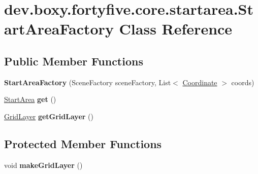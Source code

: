 \hypertarget{classdev_1_1boxy_1_1fortyfive_1_1core_1_1startarea_1_1_start_area_factory}{
\section{dev.boxy.fortyfive.core.startarea.StartAreaFactory Class Reference}
\label{d4/d95/classdev_1_1boxy_1_1fortyfive_1_1core_1_1startarea_1_1_start_area_factory}
}
\subsection*{Public Member Functions}
\begin{DoxyCompactItemize}
\item 
\hypertarget{classdev_1_1boxy_1_1fortyfive_1_1core_1_1startarea_1_1_start_area_factory_a0b81529c72cd5f4fe4e46e2f969b6a90}{
{\bfseries StartAreaFactory} (SceneFactory sceneFactory, List$<$ \hyperlink{classdev_1_1boxy_1_1fortyfive_1_1core_1_1startarea_1_1_coordinate}{Coordinate} $>$ coords)}
\label{d4/d95/classdev_1_1boxy_1_1fortyfive_1_1core_1_1startarea_1_1_start_area_factory_a0b81529c72cd5f4fe4e46e2f969b6a90}

\item 
\hypertarget{classdev_1_1boxy_1_1fortyfive_1_1core_1_1startarea_1_1_start_area_factory_ab0d2a38edc37614c25e7f5faed638a38}{
\hyperlink{classdev_1_1boxy_1_1fortyfive_1_1core_1_1startarea_1_1_start_area}{StartArea} {\bfseries get} ()}
\label{d4/d95/classdev_1_1boxy_1_1fortyfive_1_1core_1_1startarea_1_1_start_area_factory_ab0d2a38edc37614c25e7f5faed638a38}

\item 
\hypertarget{classdev_1_1boxy_1_1fortyfive_1_1core_1_1startarea_1_1_start_area_factory_a378936040c68b96438d151ce36b21bb9}{
\hyperlink{classdev_1_1boxy_1_1fortyfive_1_1_grid_layer}{GridLayer} {\bfseries getGridLayer} ()}
\label{d4/d95/classdev_1_1boxy_1_1fortyfive_1_1core_1_1startarea_1_1_start_area_factory_a378936040c68b96438d151ce36b21bb9}

\end{DoxyCompactItemize}
\subsection*{Protected Member Functions}
\begin{DoxyCompactItemize}
\item 
\hypertarget{classdev_1_1boxy_1_1fortyfive_1_1core_1_1startarea_1_1_start_area_factory_a8b2435a080f57d2e600b404e9f089e4f}{
void {\bfseries makeGridLayer} ()}
\label{d4/d95/classdev_1_1boxy_1_1fortyfive_1_1core_1_1startarea_1_1_start_area_factory_a8b2435a080f57d2e600b404e9f089e4f}

\end{DoxyCompactItemize}
